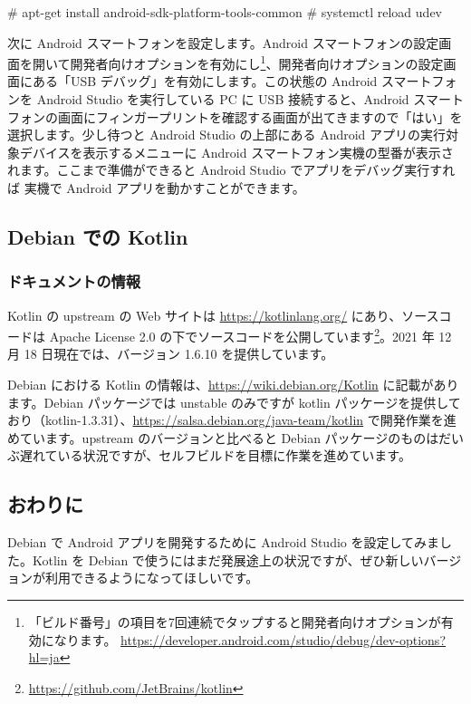 \documentclass[mingoth,a4paper]{jsarticle}
\begin{document}
\begin{commandline}
# apt-get install android-sdk-platform-tools-common
# systemctl reload udev
\end{commandline}

次に Android スマートフォンを設定します。Android スマートフォンの設定画面を開いて開発者向けオプションを有効にし\footnote{「ビルド番号」の項目を7回連続でタップすると開発者向けオプションが有効になります。 \url{https://developer.android.com/studio/debug/dev-options?hl=ja}}、開発者向けオプションの設定画面にある「USB デバッグ」を有効にします。この状態の Android スマートフォンを Android Studio を実行している PC に USB 接続すると、Android スマートフォンの画面にフィンガープリントを確認する画面が出てきますので「はい」を選択します。少し待つと Android Studio の上部にある Android アプリの実行対象デバイスを表示するメニューに Android スマートフォン実機の型番が表示されます。ここまで準備ができると Android Studio でアプリをデバッグ実行すれば 実機で Android アプリを動かすことができます。


\subsection{Debian での Kotlin}

\subsubsection{ドキュメントの情報}

Kotlin の upstream の Web サイトは \url{https://kotlinlang.org/} にあり、ソースコードは Apache License 2.0 の下でソースコードを公開しています\footnote{\url{https://github.com/JetBrains/kotlin}}。2021 年 12 月 18 日現在では、バージョン 1.6.10 を提供しています。

Debian における Kotlin の情報は、\url{https://wiki.debian.org/Kotlin} に記載があります。Debian パッケージでは unstable のみですが  kotlin パッケージを提供しており（kotlin-1.3.31）、\url{https://salsa.debian.org/java-team/kotlin} で開発作業を進めています。upstream のバージョンと比べると Debian パッケージのものはだいぶ遅れている状況ですが、セルフビルドを目標に作業を進めています。


\subsection{おわりに}

Debian で Android アプリを開発するために Android Studio を設定してみました。Kotlin を Debian で使うにはまだ発展途上の状況ですが、ぜひ新しいバージョンが利用できるようになってほしいです。
\end{document}
